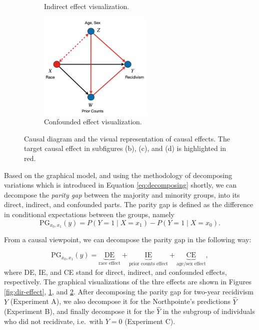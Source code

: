 \documentclass{article}
\begin{document}
\begin{figure}
\begin{subfigure}[b]{0.475\textwidth}
            \caption[]%
            {{\small Indirect effect visualization.}}    
            \label{fig:indir-effect}
        \end{subfigure}
        \hfill
        \begin{subfigure}[b]{0.475\textwidth}   
            \centering 
            \includegraphics[width=0.6\textwidth]{d}
            \caption[]%
            {{\small Confounded effect visualization.}}    
            \label{fig:conf-effect}
        \end{subfigure}
        \caption[ Causal diagram and the visual representation of causal effects. ]
        {\small Causal diagram and the visual representation of causal effects. The target causal effect in subfigures (b), (c), and (d) is highlighted in red.} 
        \label{fig:graphs}
    \end{figure}

Based on the graphical model, and using the methodology of decomposing
variations which is introduced in Equation \ref{eq:decomposing} shortly,
we can decompose the \emph{parity gap} between the majority and minority
groups, into its direct, indirect, and confounded parts. The parity gap
is defined as the difference in conditional expectations between the
groups, namely \begin{equation} \label{eq:decomposing}
  \text{PG}_{x_0, x_1}(y) = P(Y = 1\mid X = x_1) - P(Y = 1 \mid X = x_0).
\end{equation}

From a causal viewpoint, we can decompose the parity gap in the
following way:

\begin{equation}
  \text{PG}_{x_0, x_1}(y) = \underbrace{\text{DE}}_{\text{race effect}} +  \underbrace{\text{IE}}_{\text{prior counts effect}} +  \underbrace{\text{CE}}_{\text{age/sex effect}},
\end{equation} where DE, IE, and CE stand for direct, indirect, and
confounded effects, respectively. The graphical visualizations of the
thre effects are shown in Figures \ref{fig:dir-effect},
\ref{fig:indir-effect}, and \ref{fig:conf-effect}. After decomposing the
parity gap for two-year recidivism \(Y\) (Experiment A), we also
decompose it for the Northpointe's predictions \(\hat{Y}\) (Experiment
B), and finally decompose it for the \(\hat{Y}\) in the subgroup of
individuals who did not recidivate, i.e.~with \(Y = 0\) (Experiment C).
\end{document}
